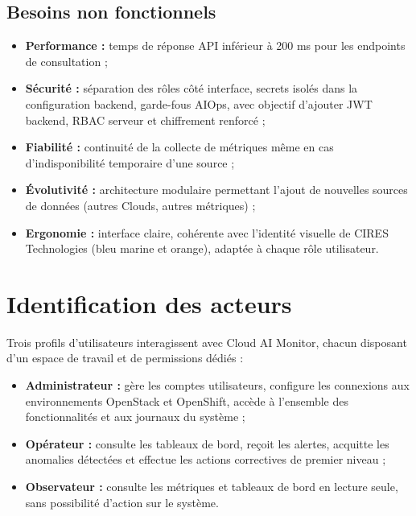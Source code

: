 \documentclass[11pt,a4paper]{report}
\begin{document}
\subsection{Besoins non fonctionnels}

\begin{itemize}[label=\textbullet, leftmargin=1.5cm, labelsep=0.5cm,
                itemsep=0.2em, parsep=0em, topsep=0.2em]
    \item \textbf{Performance :} temps de réponse API inférieur à 200 ms pour
    les endpoints de consultation ;
    \item \textbf{Sécurité :} séparation des rôles côté interface, secrets
    isolés dans la configuration backend, garde-fous AIOps, avec objectif
    d'ajouter JWT backend, RBAC serveur et chiffrement renforcé ;
    \item \textbf{Fiabilité :} continuité de la collecte de métriques même en
    cas d'indisponibilité temporaire d'une source ;
    \item \textbf{Évolutivité :} architecture modulaire permettant l'ajout de
    nouvelles sources de données (autres Clouds, autres métriques) ;
    \item \textbf{Ergonomie :} interface claire, cohérente avec l'identité
    visuelle de CIRES Technologies (bleu marine et orange), adaptée à chaque
    rôle utilisateur.
\end{itemize}

\section{Identification des acteurs}

Trois profils d'utilisateurs interagissent avec Cloud AI Monitor, chacun
disposant d'un espace de travail et de permissions dédiés :

\begin{itemize}[label=\textbullet, leftmargin=1.5cm, labelsep=0.5cm,
                itemsep=0.3em, parsep=0em, topsep=0.3em]
    \item \textbf{Administrateur :} gère les comptes utilisateurs, configure
    les connexions aux environnements OpenStack et OpenShift, accède à
    l'ensemble des fonctionnalités et aux journaux du système ;
    \item \textbf{Opérateur :} consulte les tableaux de bord, reçoit les
    alertes, acquitte les anomalies détectées et effectue les actions
    correctives de premier niveau ;
    \item \textbf{Observateur :} consulte les métriques et tableaux de bord
    en lecture seule, sans possibilité d'action sur le système.
\end{itemize}
\end{document}
